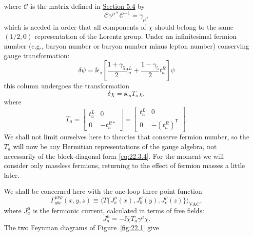where $\mathcal C$ is the matrix defined in \hyperref[sec:5.4]{Section 5.4}
by
\[
 \mathcal C\gamma^{\mu *}\mathcal C^{-1}=\gamma_\mu,
\]
which is needed in order that all components of $\chi$ should belong to the
same $(1/2,0)$ representation of the Lorentz group. Under an infinitesimal
fermion number (e.g., baryon number or baryon number minus lepton number)
conserving gauge transformation:
\begin{equation}
 \delta\psi=\ii\epsilon_a
 \left[
  \frac{1+\gamma_5}{2}t_a^L
  +\frac{1-\gamma_5}{2}t_a^R
 \right]\psi
 \tag{22.3.2}\label{eq:22.3.2}
\end{equation}
this column undergoes the transformation
\begin{equation}
 \delta\chi=\ii\epsilon_a T_a\chi,
 \tag{22.3.3}\label{eq:22.3.3}
\end{equation}
where
\begin{equation}
 T_a=
 \begin{bmatrix}
  t_a^L&0\\
  0&-t_a^{R*}
 \end{bmatrix}
 =
 \begin{bmatrix}
  t_a^L&0\\
  0&-(t_a^R)^{\mathsf T}
 \end{bmatrix}.
 \tag{22.3.4}\label{eq:22.3.4}
\end{equation}
We shall not limit ourselves here to theories that conserve fermion number,
so the $T_a$ will now be any Hermitian representations of the gauge
algebra, not necessarily of the block-diagonal form \eqref{eq:22.3.4}. For
the moment we will consider only massless fermions, returning to the effect
of fermion masses a little later.

We shall be concerned here with the one-loop three-point function
\begin{equation}
 \Gamma_{abc}^{\mu\nu\rho}(x,y,z)
 \equiv
 \bigl\langle
  T\{J_a^\mu(x),J_b^\nu(y),J_c^\rho(z)\}
 \bigr\rangle_{\mathrm{VAC}},
 \tag{22.3.5}\label{eq:22.3.5}
\end{equation}
where $J_a^\mu$ is the fermionic current, calculated in terms of free
fields:
\begin{equation}
 J_a^\mu=-\ii\bar\chi T_a\gamma^\mu\chi.
 \tag{22.3.6}\label{eq:22.3.6}
\end{equation}
The two Feynman diagrams of Figure~\ref{fig:22.1} give



